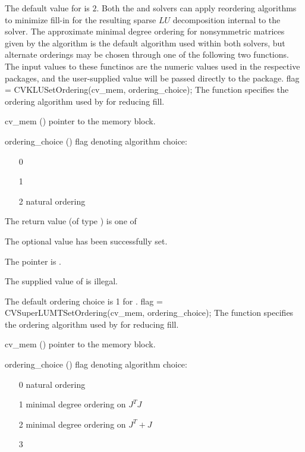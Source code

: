 {
  The default value for  is $2$.
}
Both the {\cvklu} and {\cvsuperlumt} solvers can apply reordering
algorithms to minimize fill-in for the resulting sparse $LU$
decomposition internal to the solver.  The approximate minimal degree
ordering for nonsymmetric matrices given by the  algorithm
is the default algorithm used within both solvers, but alternate
orderings may be chosen through one of the following two functions.
The input values to these functinos are the numeric values used in the respective
packages, and the user-supplied value will be passed directly to the package.
{
  flag = CVKLUSetOrdering(cv\_mem, ordering\_choice);
}
{
  The function  specifies the ordering algorithm
  used by {\cvklu} for reducing fill.
}
{
  \begin{args}[cv\_mem]
  \item[cv\_mem] ()
    pointer to the {\cvode} memory block.
  \item[ordering\_choice] ()
    flag denoting algorithm choice:
    \begin{itemize}
    \item[0] 
    \item[1] 
    \item[2] natural ordering
    \end{itemize}
  \end{args}
}
{
  The return value  (of type ) is one of
  \begin{args}
  \item[\Id{CVSLS\_SUCCESS}] 
    The optional value has been successfully set.
  \item[\Id{CVSLS\_MEM\_NULL}]
    The  pointer is .
  \item[\Id{CVSLS\_ILL\_INPUT}]
    The supplied value of  is illegal.
  \end{args}
}
{
  The default ordering choice is 1 for .
}
{
  flag = CVSuperLUMTSetOrdering(cv\_mem, ordering\_choice);
}
{
  The function  specifies the ordering algorithm
  used by {\cvsuperlumt} for reducing fill.
}
{
  \begin{args}[cv\_mem]
  \item[cv\_mem] ()
    pointer to the {\cvode} memory block.
  \item[ordering\_choice] ()
    flag denoting algorithm choice:
    \begin{itemize}
    \item[0] natural ordering
    \item[1] minimal degree ordering on $J^TJ$
    \item[2] minimal degree ordering on $J^T + J$
    \item[3] 
    \end{itemize}
  \end{args}
}
